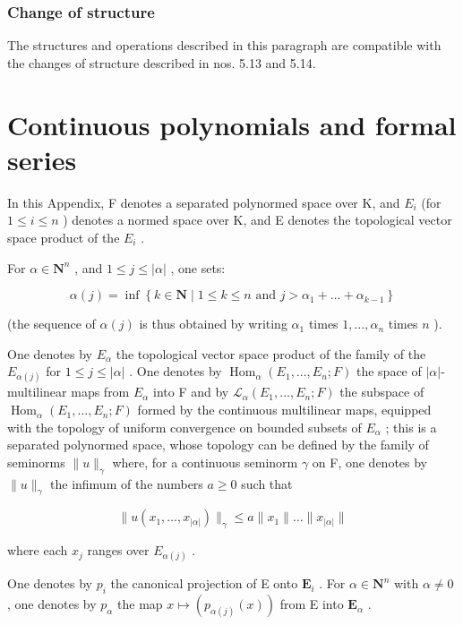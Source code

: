 \subsection{Change of structure}

The structures and operations described in this paragraph are compatible with the changes of structure described in nos. 5.13 and 5.14.

\appendix

\chapter{Continuous polynomials and formal series}

In this Appendix, F denotes a separated polynormed space over K, and \(E_{i}\) (for \(1 \leqslant i \leqslant n\) ) denotes a normed space over K, and E denotes the topological vector space product of the \(E_{i}\) .

For \(\alpha \in \mathbf{N}^n\) , and \(1 \leqslant j \leqslant |\alpha|\) , one sets:

\[
\alpha (j) = \inf \left\{k \in \mathbf {N} \mid 1 \leqslant k \leqslant n \text { and } j > \alpha_ {1} + \dots + \alpha_ {k - 1} \right\}
\]

(the sequence of \(\alpha(j)\) is thus obtained by writing \(\alpha_{1}\) times \(1,\ldots,\alpha_{n}\) times \(n\) ).

One denotes by \(E_{\alpha}\) the topological vector space product of the family of the \(E_{\alpha(j)}\) for \(1 \leqslant j \leqslant |\alpha| \) . One denotes by \(\operatorname{Hom}_{\alpha}(E_1, \ldots, E_n; F)\) the space of \(|\alpha|\)-multilinear maps from \(E_{\alpha}\) into F and by \(\mathcal{L}_{\alpha}(E_1, \ldots, E_n; F)\) the subspace of \(\operatorname{Hom}_{\alpha}(E_1, \ldots, E_n; F)\) formed by the continuous multilinear maps, equipped with the topology of uniform convergence on bounded subsets of \(E_{\alpha}\) ; this is a separated polynormed space, whose topology can be defined by the family of seminorms \(\| u \|_{\gamma}\) where, for a continuous seminorm \(\gamma\) on F, one denotes by \(\| u \|_{\gamma}\) the infimum of the numbers \(a \geqslant 0\) such that

\[
\| u (x _ {1}, \dots , x _ {| \alpha |}) \| _ {\gamma} \leqslant a \| x _ {1} \| \dots \| x _ {| \alpha |} \|
\]

where each \(x_{j}\) ranges over \(E_{\alpha(j)}\) .

One denotes by \(p_{i}\) the canonical projection of E onto \(\mathbf{E}_{i}\) . For \(\alpha\in\mathbf{N}^{n}\) with \(\alpha\neq0\) , one denotes by \(p_{\alpha}\) the map \(x\mapsto(p_{\alpha(j)}(x))\) from E into \(\mathbf{E}_{\alpha}\) .

